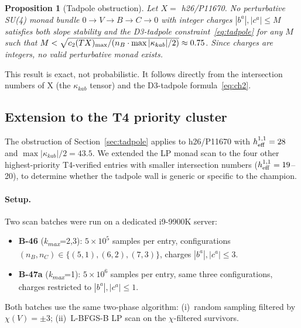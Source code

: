 \documentclass[11pt,a4paper]{article}
\newtheorem{proposition}{Proposition}
\newcommand{\hone}{h^{1,1}}
\begin{document}
\begin{proposition}[Tadpole obstruction]
  Let $X = $ h26/P11670.
  No perturbative SU(4) monad bundle $0\to V\to B\to C\to 0$
  with integer charges $|b^a|, |c^a| \leq M$ satisfies both
  slope stability and the D3-tadpole constraint~\eqref{eq:tadpole}
  for any $M$ such that
  $M < \sqrt{c_2(TX)_{\rm max}/(n_B \cdot \max|\kappa_{kab}|/2)}
    \approx 0.75$.
  Since charges are integers, no valid perturbative monad exists.
\end{proposition}

\noindent
This result is exact, not probabilistic.
It follows directly from the intersection numbers of X (the
$\kappa_{kab}$ tensor) and the D3-tadpole formula~\eqref{eq:ch2}.

\subsection{Extension to the T4 priority cluster}
\label{sec:monad_universal}

The obstruction of Section~\ref{sec:tadpole} applies to h26/P11670
with $\hone_{\rm eff}=28$ and $\max|\kappa_{kab}|/2=43.5$.
We extended the LP monad scan to the four other highest-priority
T4-verified entries with smaller intersection numbers
($\hone_{\rm eff}=19$--20), to determine whether the tadpole wall
is generic or specific to the champion.

\paragraph{Setup.}
Two scan batches were run on a dedicated i9-9900K server:
\begin{itemize}[noitemsep]
  \item \textbf{B-46} (\textit{k\textsubscript{max}}=2,3):
    $5\times10^5$ samples per entry, configurations
    $(n_B,n_C)\in\{(5,1),(6,2),(7,3)\}$,
    charges $|b^a|,|c^a|\leq 3$.
  \item \textbf{B-47a} (\textit{k\textsubscript{max}}=1):
    $5\times10^6$ samples per entry,
    same three configurations,
    charges restricted to $|b^a|,|c^a|\leq 1$.
\end{itemize}
Both batches use the same two-phase algorithm: (i)~random
sampling filtered by $\chi(V)=\pm 3$; (ii)~L-BFGS-B LP scan
on the $\chi$-filtered survivors.
\end{document}
